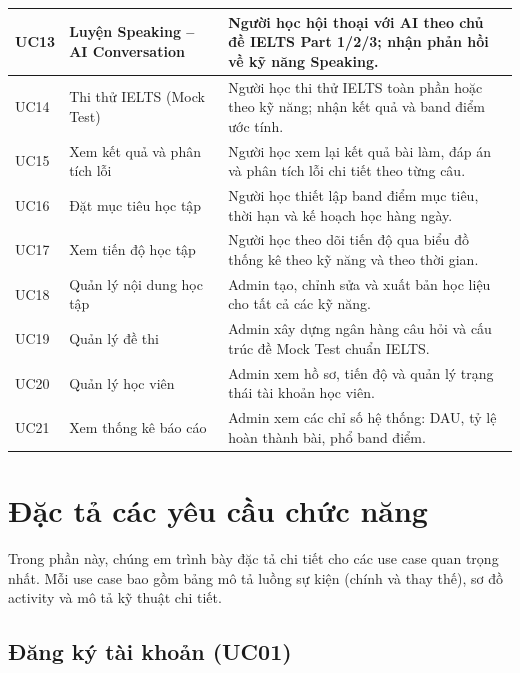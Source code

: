 \documentclass[a4paper,12pt]{extreport}
\begin{document}
\begin{longtable}{|p{1.5cm}|p{4.5cm}|p{8.0cm}|}
    UC13 & Luyện Speaking -- AI Conversation & Người học hội thoại với AI theo chủ đề IELTS Part 1/2/3; nhận phản hồi về kỹ năng Speaking. \\ \hline
    UC14 & Thi thử IELTS (Mock Test) & Người học thi thử IELTS toàn phần hoặc theo kỹ năng; nhận kết quả và band điểm ước tính. \\ \hline
    UC15 & Xem kết quả và phân tích lỗi & Người học xem lại kết quả bài làm, đáp án và phân tích lỗi chi tiết theo từng câu. \\ \hline
    UC16 & Đặt mục tiêu học tập & Người học thiết lập band điểm mục tiêu, thời hạn và kế hoạch học hàng ngày. \\ \hline
    UC17 & Xem tiến độ học tập & Người học theo dõi tiến độ qua biểu đồ thống kê theo kỹ năng và theo thời gian. \\ \hline
    UC18 & Quản lý nội dung học tập & Admin tạo, chỉnh sửa và xuất bản học liệu cho tất cả các kỹ năng. \\ \hline
    UC19 & Quản lý đề thi & Admin xây dựng ngân hàng câu hỏi và cấu trúc đề Mock Test chuẩn IELTS. \\ \hline
    UC20 & Quản lý học viên & Admin xem hồ sơ, tiến độ và quản lý trạng thái tài khoản học viên. \\ \hline
    UC21 & Xem thống kê báo cáo & Admin xem các chỉ số hệ thống: DAU, tỷ lệ hoàn thành bài, phổ band điểm. \\ \hline
\end{longtable}

\section{Đặc tả các yêu cầu chức năng}

Trong phần này, chúng em trình bày đặc tả chi tiết cho các use case quan trọng nhất. Mỗi use case bao gồm bảng mô tả luồng sự kiện (chính và thay thế), sơ đồ activity và mô tả kỹ thuật chi tiết.

\subsection{Đăng ký tài khoản (UC01)}
\end{document}
